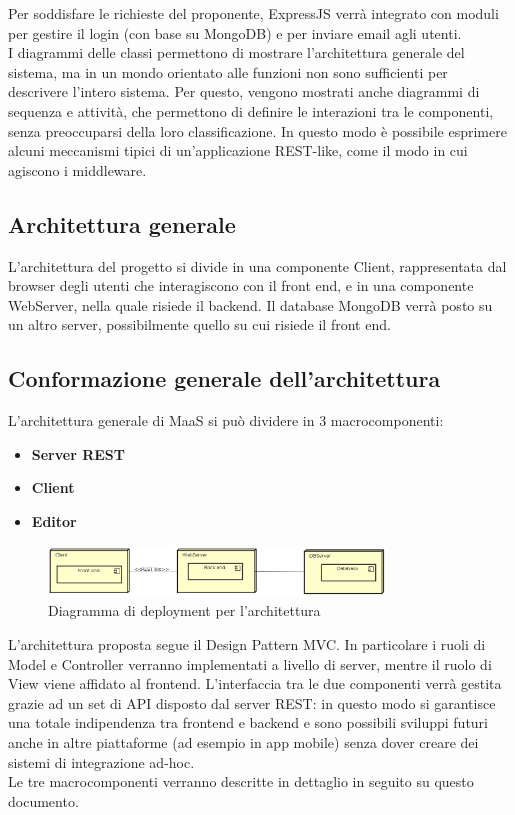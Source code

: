 Per soddisfare le richieste del proponente, ExpressJS verrà integrato con moduli per gestire il login (con base su MongoDB) e per inviare email agli utenti. \\
I diagrammi delle classi permettono di mostrare l'architettura generale del sistema, ma in un mondo orientato alle funzioni non sono sufficienti per descrivere l'intero sistema. Per questo, vengono mostrati anche diagrammi di sequenza e attività, che permettono di definire le interazioni tra le componenti, senza preoccuparsi della loro classificazione. In questo modo è possibile esprimere alcuni meccanismi tipici di un'applicazione REST-like, come il modo in cui agiscono i middleware. 
\subsection{Architettura generale}
L'architettura del progetto si divide in una componente Client, rappresentata dal browser degli utenti che interagiscono con il front end, e in una componente WebServer, nella quale risiede il backend. Il database MongoDB verrà posto su un altro server, possibilmente quello su cui risiede il front end. \\
\subsection{Conformazione generale dell'architettura}
L'architettura generale di MaaS si può dividere in 3 macrocomponenti:
\begin{itemize}
\item \textbf{Server REST} 
\item \textbf{Client} 
\item \textbf{Editor}
\end{itemize}
\begin{figure}[h]
\centering
\includegraphics[width=0.8\textwidth]{res/sections/GeneralArchitecture.png}
\caption{Diagramma di deployment per l'architettura}
\end{figure}
L'architettura proposta segue il Design Pattern MVC. In particolare i ruoli di Model e Controller verranno implementati a livello di server, mentre il ruolo di View viene affidato al frontend. L'interfaccia tra le due componenti verrà gestita grazie ad un set di API disposto dal server REST: in questo modo si garantisce una totale indipendenza tra frontend e backend e sono possibili sviluppi futuri anche in altre piattaforme (ad esempio in app mobile) senza dover creare dei sistemi di integrazione ad-hoc. \\
Le tre macrocomponenti verranno descritte in dettaglio in seguito su questo documento.
